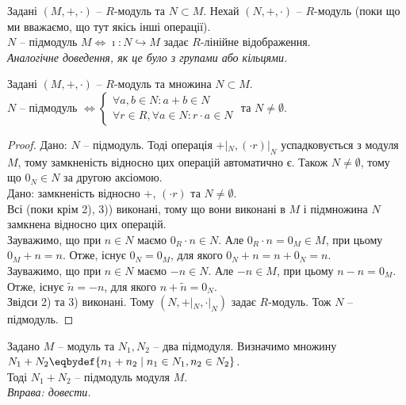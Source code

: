 \documentclass{math_library}
\begin{document}
\begin{proposition}
Задані $(M,+,\cdot)$ -- $R$-модуль та $N \subset M$. Нехай $(N,+,\cdot)$ -- $R$-модуль (поки що ми вважаємо, що тут якісь інші операції).\\
$N$ -- підмодуль $M \iff \imath \colon N \hookrightarrow M$ задає $R$-лінійне відображення.\\
\textit{Аналогічне доведення, як це було з групами або кільцями.}
\end{proposition}

\begin{theorem}
Задані $(M,+,\cdot)$ -- $R$-модуль та множина $N \subset M$.\\
$N$ -- підмодуль $\iff \begin{cases} \forall a,b \in N: a+b \in N \\ \forall r \in R, \forall a \in N: r \cdot a \in N \end{cases}$ та $N \neq \emptyset$.
\end{theorem}

\begin{proof}
\rightproof Дано: $N$ -- підмодуль. Тоді операція $+|_N, (\cdot r)|_N$ успадковується з модуля $M$, тому замкненість відносно цих операцій автоматично є. Також $N \neq \emptyset$, тому що $0_N \in N$ за другою аксіомою.
\bigskip \\
\leftproof Дано: замкненість відносно $+$, $(\cdot r)$ та $N \neq \emptyset$.\\
Всі (поки крім 2), 3)) виконані, тому що вони виконані в $M$ і підмножина $N$ замкнена відносно цих операцій.\\
Зауважимо, що при $n \in N$ маємо $0_R \cdot n \in N$. Але $0_R \cdot n = 0_M \in M$, при цьому $0_M + n = n$. Отже, існує $0_N = 0_M$, для якого $0_N + n = n + 0_N = n$.\\
Зауважимо, що при $n \in N$ маємо $-n \in N$. Але $-n \in M$, при цьому $n - n = 0_M$. Отже, існує $\tilde{n} = -n$, для якого $n + \tilde{n} = 0_N$.\\
Звідси 2) та 3) виконані. Тому $(N,+|_N, \cdot|_N)$ задає $R$-модуль. Тож $N$ -- підмодуль.
\end{proof}

\begin{proposition}
Задано $M$ -- модуль та $N_1,N_2$ -- два підмодуля. Визначимо множину $N_1 + N_2 \eqbydef \{n_1 + n_2 \mid n_1 \in N_1, n_2 \in N_2\}$.\\
Тоді $N_1+N_2$ -- підмодуль модуля $M$.\\
\textit{Вправа: довести.}
\end{proposition}
\end{document}
